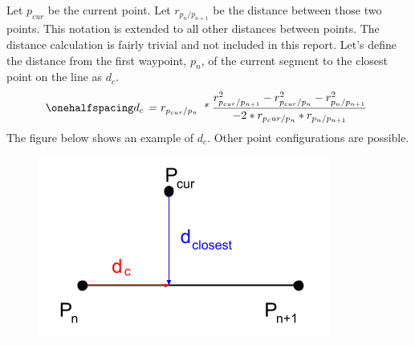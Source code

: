 \documentclass[12pt]{article}
\begin{document}
Let \textit{$p_{cur}$} be the current point. Let \textit{$r_{p_n/p_{n+1}}$} be the distance between those two points. This notation is extended to all other distances between points. The distance calculation is fairly trivial and not included in this report. Let's define the distance from the first waypoint, \textit{$p_n$}, of the current segment to the closest point on the line as \textit{$d_c$}. 
\begin{equation}
\onehalfspacing
\centering
\emph{$d_c$ = $r_{p_{cur}/p_n}$ * $\frac{r_{p_{cur}/p_{n+1}}^2 -  r_{p_{cur}/p_n}^2 - r_{p_n/p_{n+1}}^2}{-2*r_{p_cur/p_n}*r_{p_n/p_{n+1}}}$ }
\end{equation}
The figure below shows an example of \textit{$d_c$}. Other point configurations are possible.   
\begin{figure}[ht]
\hspace{0.5cm}
\centering
\includegraphics[scale=0.5]{Pictures/points_1.png}
\end{figure}


 
\end{document}
